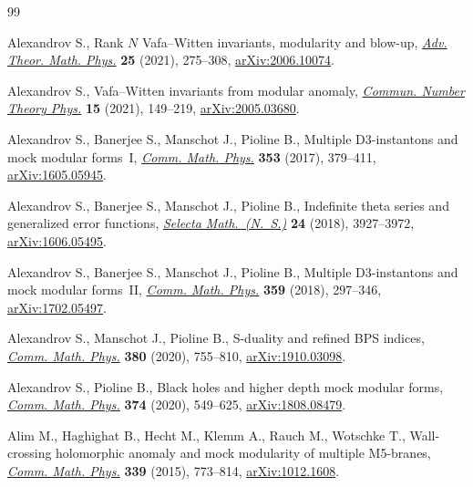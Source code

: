 \documentclass[pdftex]{sigma}
\theoremstyle{definition}
\numberwithin{equation}{section}
\begin{document}
\begin{thebibliography}{99}
\footnotesize\itemsep=0pt

Alexandrov S., Rank {$N$} {V}afa--{W}itten invariants, modularity and blow-up,
 \href{https://doi.org/10.4310/ATMP.2021.v25.n2.a1}{\textit{Adv. Theor. Math. Phys.}} \textbf{25} (2021), 275--308,
 \href{https://arxiv.org/abs/2006.10074}{arXiv:2006.10074}.

Alexandrov S., Vafa--{W}itten invariants from modular anomaly, \href{https://doi.org/10.4310/CNTP.2021.v15.n1.a4}{\textit{Commun.
 Number Theory Phys.}} \textbf{15} (2021), 149--219, \href{https://arxiv.org/abs/2005.03680}{arXiv:2005.03680}.

Alexandrov S., Banerjee S., Manschot J., Pioline B., Multiple {D}3-instantons
 and mock modular forms~{I}, \href{https://doi.org/10.1007/s00220-016-2799-0}{\textit{Comm. Math. Phys.}} \textbf{353} (2017),
 379--411, \href{https://arxiv.org/abs/1605.05945}{arXiv:1605.05945}.

Alexandrov S., Banerjee S., Manschot J., Pioline B., Indefinite theta series
 and generalized error functions, \href{https://doi.org/10.1007/s00029-018-0444-9}{\textit{Selecta Math.~(N.~S.)}} \textbf{24}
 (2018), 3927--3972, \href{https://arxiv.org/abs/1606.05495}{arXiv:1606.05495}.

Alexandrov S., Banerjee S., Manschot J., Pioline B., Multiple {D}3-instantons
 and mock modular forms~{II}, \href{https://doi.org/10.1007/s00220-018-3114-z}{\textit{Comm. Math. Phys.}} \textbf{359} (2018),
 297--346, \href{https://arxiv.org/abs/1702.05497}{arXiv:1702.05497}.

Alexandrov S., Manschot J., Pioline B., S-duality and refined {BPS} indices,
 \href{https://doi.org/10.1007/s00220-020-03854-6}{\textit{Comm. Math. Phys.}} \textbf{380} (2020), 755--810,
 \href{https://arxiv.org/abs/1910.03098}{arXiv:1910.03098}.

Alexandrov S., Pioline B., Black holes and higher depth mock modular forms,
 \href{https://doi.org/10.1007/s00220-019-03609-y}{\textit{Comm. Math. Phys.}} \textbf{374} (2020), 549--625,
 \href{https://arxiv.org/abs/1808.08479}{arXiv:1808.08479}.

Alim M., Haghighat B., Hecht M., Klemm A., Rauch M., Wotschke T., Wall-crossing
 holomorphic anomaly and mock modularity of multiple {M}5-branes,
 \href{https://doi.org/10.1007/s00220-015-2436-3}{\textit{Comm. Math. Phys.}} \textbf{339} (2015), 773--814, \href{https://arxiv.org/abs/1012.1608}{arXiv:1012.1608}.


\end{thebibliography}
\end{document}
